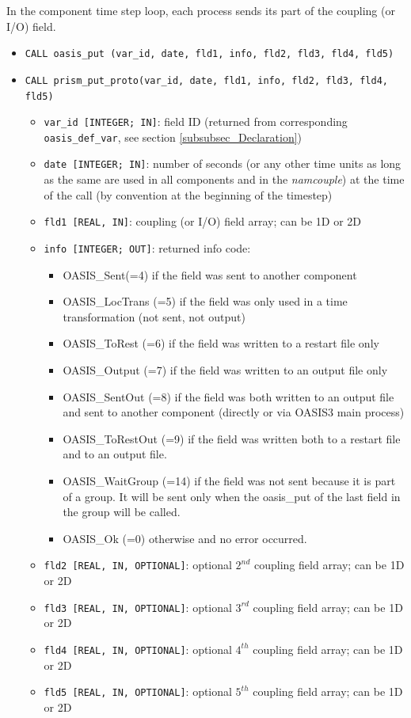 In the component time step loop, each process sends its part of the
coupling (or I/O) field.

\begin{itemize}
\item {\tt CALL oasis\_put (var\_id, date, fld1, info, fld2, fld3,
    fld4, fld5)}
\item {\tt CALL prism\_put\_proto(var\_id, date, fld1, info, fld2,
    fld3, fld4, fld5)}
  \begin{itemize}
  \item {\tt var\_id [INTEGER; IN]}: field ID (returned from corresponding {\tt
      oasis\_def\_var}, see section \ref{subsubsec_Declaration})
  \item {\tt date [INTEGER; IN]}: number of seconds (or any other time
    units as long as the same are used in all components and in the {\it
      namcouple}) at the time of the call (by convention at the
    beginning of the timestep)
  \item {\tt fld1 [REAL, IN]}: coupling (or I/O) field array; can be
    1D or 2D
  \item {\tt info [INTEGER; OUT]}: returned info code:
    \begin{itemize}
    \item OASIS\_Sent(=4) if the field was sent to another component
    \item OASIS\_LocTrans (=5) if the field was only used in a time
      transformation (not sent, not output)
    \item OASIS\_ToRest (=6) if the field was written to a restart
      file only
    \item OASIS\_Output (=7) if the field was written to an output
      file only
    \item OASIS\_SentOut (=8) if the field was both written to an
      output file and sent to another component (directly or via OASIS3
      main process)
    \item OASIS\_ToRestOut (=9) if the field was written both to a
      restart file and to an output file.
    \item OASIS\_WaitGroup (=14) if the field was not sent because it is part of a group.
    It will be sent only when the oasis\_put of the last field in the group will be called.
    \item OASIS\_Ok (=0) otherwise and no error occurred.
    \end{itemize}
  \item {\tt fld2 [REAL, IN, OPTIONAL]}: optional $2^{nd}$ coupling
    field array; can be 1D or 2D
  \item {\tt fld3 [REAL, IN, OPTIONAL]}: optional $3^{rd}$ coupling
    field array; can be 1D or 2D
  \item {\tt fld4 [REAL, IN, OPTIONAL]}: optional $4^{th}$ coupling
    field array; can be 1D or 2D
  \item {\tt fld5 [REAL, IN, OPTIONAL]}: optional $5^{th}$ coupling
    field array; can be 1D or 2D
  \end{itemize}
\end{itemize}

